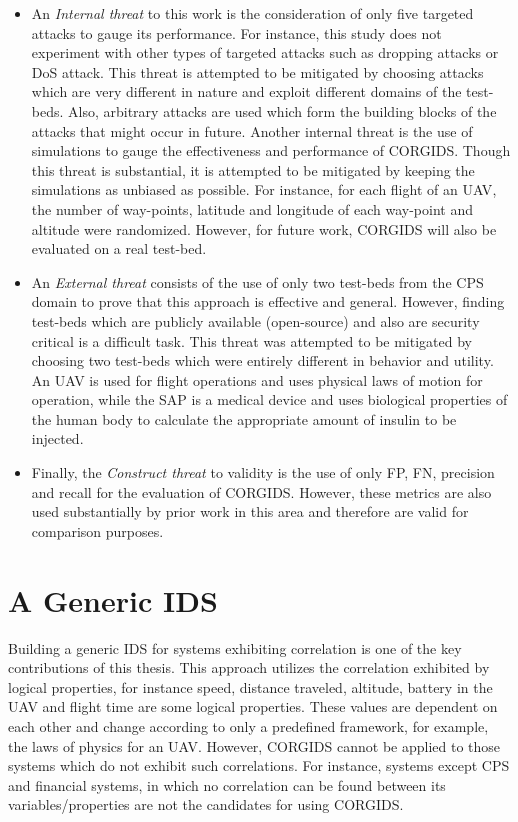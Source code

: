 \begin{itemize}
\item An \textit{Internal threat} to this work is the consideration of only five targeted attacks to gauge its performance. For instance, this study does not experiment with other types of targeted attacks such as dropping attacks or \ac{DoS} attack. This threat is attempted to be mitigated by choosing attacks which are very different in nature and exploit different domains of the test-beds. Also, arbitrary attacks are used which form the building blocks of the attacks that might occur in future. Another internal threat is the use of simulations to gauge the effectiveness and performance of \ac{CORGIDS}. Though this threat is substantial, it is attempted to be mitigated by keeping the simulations as unbiased as possible. For instance, for each flight of an \ac{UAV}, the number of way-points, latitude and longitude of each way-point and altitude were randomized. However, for future work, \ac{CORGIDS} will also be evaluated on a real test-bed. 

\item An \textit{External threat} consists of the use of only two test-beds from the \ac{CPS} domain to prove that this approach is effective and general. However, finding test-beds which are publicly available (open-source) and also are security critical is a difficult task. This threat was attempted to be mitigated by choosing two test-beds which were entirely different in behavior and utility. An \ac{UAV} is used for flight operations and uses physical laws of motion for operation, while the SAP is a medical device and uses biological properties of the human body to calculate the appropriate amount of insulin to be injected. 

\item Finally, the \textit{Construct  threat} to validity is the use of only \ac{FP}, \ac{FN}, precision and recall for the evaluation of \ac{CORGIDS}. However, these metrics are also used substantially by prior work in this area and therefore are valid for comparison purposes. 
\end{itemize}

\section{A Generic IDS}
Building a generic \ac{IDS} for systems exhibiting correlation is one of the key contributions of this thesis. This approach utilizes the correlation exhibited by logical properties, for instance speed, distance traveled, altitude, battery in the \ac{UAV} and flight time are some logical properties. These values are dependent on each other and change according to only a predefined framework, for example, the laws of physics for an \ac{UAV}. However, \ac{CORGIDS} cannot be applied to those systems which do not exhibit such correlations. For instance, systems except \ac{CPS} and financial systems, in which no correlation can be found between its variables/properties are not the candidates for using \ac{CORGIDS}.


